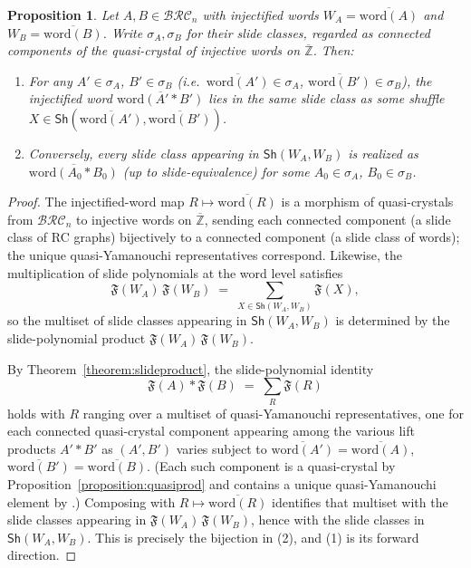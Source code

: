 \documentclass{amsart}
\newtheorem{proposition}[lemma]{Proposition}
\theoremstyle{definition}
\theoremstyle{remark}
\numberwithin{equation}{subsection}
\newcommand{\BRC}{\mathcal{BRC}}
\begin{document}
\begin{proposition}\label{proposition:liftshufflewords}
Let $A, B\in\BRC_n$ with injectified words $W_A=\overline{\mathrm{word}(A)}$ and $W_B=\overline{\mathrm{word}(B)}$. Write $\sigma_A,\sigma_B$ for their slide classes, regarded as connected components of the quasi-crystal of injective words on $\overline{\mathbb{Z}}$. Then:
\begin{enumerate}
\item For any $A'\in\sigma_A$, $B'\in\sigma_B$ (i.e.\ $\overline{\mathrm{word}(A')}\in\sigma_A$, $\overline{\mathrm{word}(B')}\in\sigma_B$), the injectified word $\overline{\mathrm{word}(A'*B')}$ lies in the same slide class as some shuffle $X\in\mathsf{Sh}(\overline{\mathrm{word}(A')},\overline{\mathrm{word}(B')})$.
\item Conversely, every slide class appearing in $\mathsf{Sh}(W_A,W_B)$ is realized as $\overline{\mathrm{word}(A_0*B_0)}$ (up to slide-equivalence) for some $A_0\in\sigma_A$, $B_0\in\sigma_B$.
\end{enumerate}
\end{proposition}
\begin{proof}

The injectified-word map $R\mapsto\overline{\mathrm{word}(R)}$ is a morphism of quasi-crystals from $\BRC_n$ to injective words on $\overline{\mathbb{Z}}$, sending each connected component (a slide class of RC graphs) bijectively to a connected component (a slide class of words); the unique quasi-Yamanouchi representatives correspond. Likewise, the multiplication of slide polynomials at the word level satisfies
\[
\mathfrak{F}(W_A)\,\mathfrak{F}(W_B)\;=\;\sum_{X\in\mathsf{Sh}(W_A,W_B)}\mathfrak{F}(X),
\]
so the multiset of slide classes appearing in $\mathsf{Sh}(W_A,W_B)$ is determined by the slide-polynomial product $\mathfrak{F}(W_A)\,\mathfrak{F}(W_B)$.

By Theorem~\ref{theorem:slideproduct}, the slide-polynomial identity
\[
\mathfrak{F}(A)*\mathfrak{F}(B)\;=\;\sum_{R}\mathfrak{F}(R)
\]
holds with $R$ ranging over a multiset of quasi-Yamanouchi representatives, one for each connected quasi-crystal component appearing among the various lift products $A'*B'$ as $(A',B')$ varies subject to $\overline{\mathrm{word}(A')}=\overline{\mathrm{word}(A)}$, $\overline{\mathrm{word}(B')}=\overline{\mathrm{word}(B)}$. (Each such component is a quasi-crystal by Proposition~\ref{proposition:quasiprod} and contains a unique quasi-Yamanouchi element by \cite[Proposition~4.6]{cain2023quasicrystals}.) Composing with $R\mapsto\overline{\mathrm{word}(R)}$ identifies that multiset with the slide classes appearing in $\mathfrak{F}(W_A)\,\mathfrak{F}(W_B)$, hence with the slide classes in $\mathsf{Sh}(W_A,W_B)$. This is precisely the bijection in (2), and (1) is its forward direction.
\end{proof}
\end{document}
